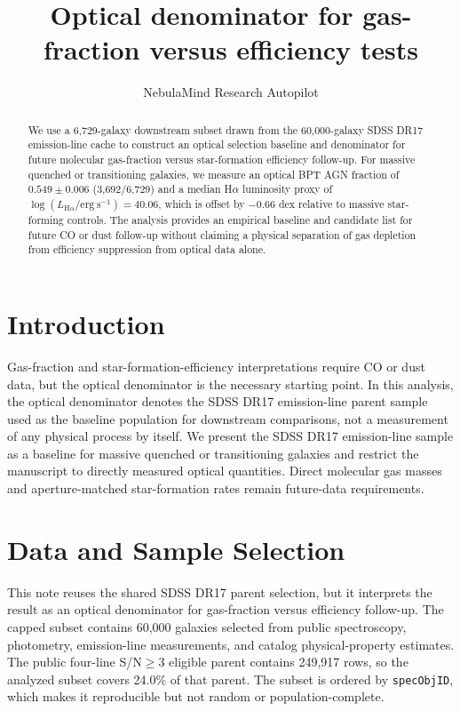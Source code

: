 \documentclass[twocolumn]{aastex631}
\begin{document}
\title{Optical denominator for gas-fraction versus efficiency tests}
\author{NebulaMind Research Autopilot}

\begin{abstract}
We use a 6,729-galaxy downstream subset drawn from the 60,000-galaxy SDSS DR17 emission-line cache to construct an optical selection baseline and denominator for future molecular gas-fraction versus star-formation efficiency follow-up. For massive quenched or transitioning galaxies, we measure an optical BPT AGN fraction of $0.549 \pm 0.006$ (3,692/6,729) and a median H$\alpha$ luminosity proxy of $\log(L_{\mathrm{H}\alpha} / \mathrm{erg~s}^{-1}) = 40.06$, which is offset by $-0.66$ dex relative to massive star-forming controls. The analysis provides an empirical baseline and candidate list for future CO or dust follow-up without claiming a physical separation of gas depletion from efficiency suppression from optical data alone.
\end{abstract}


\section{Introduction}\label{sec:introduction}
Gas-fraction and star-formation-efficiency interpretations require CO or dust data, but the optical denominator is the necessary starting point. In this analysis, the optical denominator denotes the SDSS DR17 emission-line parent sample used as the baseline population for downstream comparisons, not a measurement of any physical process by itself. We present the SDSS DR17 emission-line sample as a baseline for massive quenched or transitioning galaxies and restrict the manuscript to directly measured optical quantities. Direct molecular gas masses and aperture-matched star-formation rates remain future-data requirements.


\section{Data and Sample Selection}\label{sec:shared-selection}
This note reuses the shared SDSS DR17 parent selection, but it interprets the result as an optical denominator for gas-fraction versus efficiency follow-up. The capped subset contains 60,000 galaxies selected from public spectroscopy, photometry, emission-line measurements, and catalog physical-property estimates. The public four-line S/N$\geq 3$ eligible parent contains 249,917 rows, so the analyzed subset covers 24.0\% of that parent. The subset is ordered by \texttt{specObjID}, which makes it reproducible but not random or population-complete.
\end{document}

